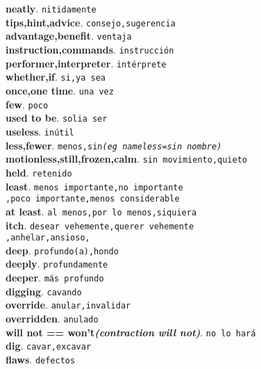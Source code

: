 \documentclass[twocolumn]{article}
\begin{document}
	\textsf{\textbf{neatly}}. \texttt{nitidamente}\\
	\textsf{\textbf{tips,hint,advice}}. \texttt{consejo,sugerencia}\\
	\textsf{\textbf{advantage,benefit}}. \texttt{ventaja}\\
	\textsf{\textbf{instruction,commands}}. \texttt{instrucci\'on}\\
	\textsf{\textbf{performer,interpreter}}. \texttt{int\'erprete}\\
	\textsf{\textbf{whether,if}}. \texttt{si,ya sea}\\
	\textsf{\textbf{once,one time}}. \texttt{una vez}\\
	\textsf{\textbf{few}}. \texttt{poco}\\
	\textsf{\textbf{used to be}}. \texttt{solia ser}\\
	\textsf{\textbf{useless}}. \texttt{in\'util}\\
	\textsf{\textbf{less,fewer}}. \texttt{menos,sin{\scriptsize \textsl{(eg nameless=sin nombre)}}}\\
	\textsf{\textbf{motionless,still,frozen,calm}}. \texttt{sin movimiento,quieto}\\
	\textsf{\textbf{held}}. \texttt{retenido}\\
	\textsf{\textbf{least}}. \texttt{menos importante,no importante\\,poco importante,menos considerable}\\
	\textsf{\textbf{at least}}. \texttt{al menos,por lo menos,siquiera}\\
	\textsf{\textbf{itch}}. \texttt{desear vehemente,querer vehemente\\,anhelar,ansioso,}\\
	\textsf{\textbf{deep}}. \texttt{profundo(a),hondo}\\
	\textsf{\textbf{deeply}}. \texttt{profundamente}\\
	\textsf{\textbf{deeper}}. \texttt{m\'as profundo}\\
	\textsf{\textbf{digging}}. \texttt{cavando}\\
	\textsf{\textbf{override}}. \texttt{anular,invalidar}\\
	\textsf{\textbf{overridden}}. \texttt{anulado}\\
	\textsf{\textbf{will not == won't{\scriptsize \textsl{(contraction will not)}}}}. \texttt{no lo har\'a}\\
	\textsf{\textbf{dig}}. \texttt{cavar,excavar}\\
	\textsf{\textbf{flaws}}. \texttt{defectos}\\
\end{document}
